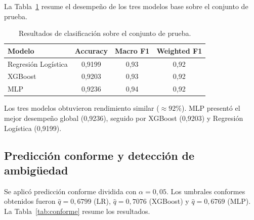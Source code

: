 \documentclass[conference]{IEEEtran}
\begin{document}
La Tabla~\ref{tab:clasificacion} resume el desempeño de los tres modelos
base sobre el conjunto de prueba.

\begin{table}[h]
\centering
\caption{Resultados de clasificación sobre el conjunto de prueba.}
\label{tab:clasificacion}
\begin{tabular}{lccc}
\toprule
\textbf{Modelo} & \textbf{Accuracy} & \textbf{Macro F1} & \textbf{Weighted F1} \\
\midrule
Regresión Logística & 0{,}9199 & 0{,}93 & 0{,}92 \\
XGBoost             & 0{,}9203 & 0{,}93 & 0{,}92 \\
MLP                 & 0{,}9236 & 0{,}94 & 0{,}92 \\
\bottomrule
\end{tabular}
\end{table}

Los tres modelos obtuvieron rendimiento similar ($\approx 92\%$). MLP
presentó el mejor desempeño global (0{,}9236), seguido por XGBoost
(0{,}9203) y Regresión Logística (0{,}9199).

\subsection{Predicción conforme y detección de ambigüedad}

Se aplicó predicción conforme dividida con $\alpha = 0{,}05$. Los
umbrales conformes obtenidos fueron $\hat{q} = 0{,}6799$ (LR),
$\hat{q} = 0{,}7076$ (XGBoost) y $\hat{q} = 0{,}6769$ (MLP).
La Tabla~\ref{tab:conforme} resume los resultados.

\begin{table}[t]
\centering
\caption{Resultados de predicción conforme ($\alpha = 0{,}05$).}
\label{tab:conforme}
\end{table}
\end{document}
